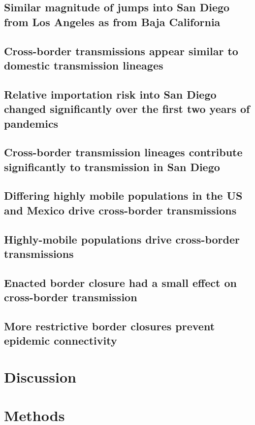 \documentclass[12pt, a4paper]{article}
\begin{document}
    \subsection*{Similar magnitude of jumps into San Diego from Los Angeles as from Baja California}
    \subsection*{Cross-border transmissions appear similar to domestic transmission lineages}
    \subsection*{Relative importation risk into San Diego changed significantly over the first two years of pandemics}
    \subsection*{Cross-border transmission lineages contribute significantly to transmission in San Diego}
    \subsection*{Differing highly mobile populations in the US and Mexico drive cross-border transmissions}
    \subsection*{Highly-mobile populations drive cross-border transmissions}
    \subsection*{Enacted border closure had a small effect on cross-border transmission}
    \subsection*{More restrictive border closures prevent epidemic connectivity}
    \section*{Discussion}

    \newpage
    \section*{Methods}
\end{document}
